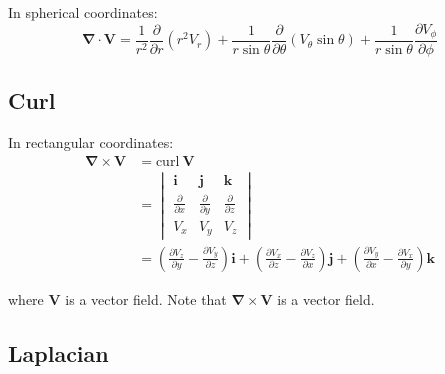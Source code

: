In spherical coordinates:
\begin{equation*}
    \bm{\nabla} \cdot \mathbf{V} = \frac{1}{r^2}\frac{\partial}{\partial r}(r^2V_r) + \frac{1}{r\sin\theta}\frac{\partial}{\partial \theta}(V_\theta \sin\theta) + \frac{1}{r\sin\theta}\frac{\partial V_\phi}{\partial \phi}
\end{equation*}

\subsection{Curl}

In rectangular coordinates:
\begin{align*}
    \bm{\nabla} \times \mathbf{V} & = \text{curl}~\mathbf{V}                                                                                                                                                                                                                                                                  \\
                                  & = \begin{vmatrix}
                                          \mathbf{i}                  & \mathbf{j}                  & \mathbf{k}                  \\
                                          \frac{\partial}{\partial x} & \frac{\partial}{\partial y} & \frac{\partial}{\partial z} \\
                                          V_x                         & V_y                         & V_z
                                      \end{vmatrix}                                                                                                                                                                                                 \\
                                  & = \left( \frac{\partial V_z}{\partial y} - \frac{\partial V_y}{\partial z} \right) \mathbf{i} + \left( \frac{\partial V_x}{\partial z} - \frac{\partial V_z}{\partial x} \right) \mathbf{j} + \left( \frac{\partial V_y}{\partial x} - \frac{\partial V_x}{\partial y} \right) \mathbf{k}
\end{align*}

where $\mathbf{V}$ is a vector field. Note that $\bm{\nabla}\times\mathbf{V}$ is a vector field.

\subsection{Laplacian}

